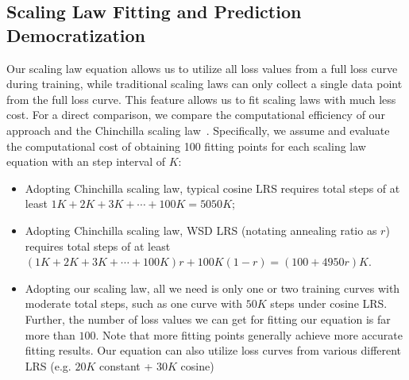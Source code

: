 \subsection{Scaling Law Fitting and Prediction Democratization}

Our scaling law equation allows us to utilize all loss values from a full loss curve during training, while traditional scaling laws can only collect a single data point from the full loss curve. This feature allows us to fit scaling laws with much less cost.
For a direct comparison, we compare the computational efficiency of our approach and the Chinchilla scaling law~\citep{hoffmann2022training}.
Specifically, we assume and evaluate the computational cost of obtaining 100 fitting points for each scaling law equation with an step interval of $K$: 

\begin{itemize}
    \item Adopting Chinchilla scaling law, typical cosine LRS requires total steps of at least $1K + 2K + 3K + \cdots + 100K = 5050K$;
    \item Adopting Chinchilla scaling law, WSD LRS (notating annealing ratio as $r$) requires total steps of at least $(1K + 2K + 3K + \cdots + 100K)r + 100K(1-r) = (100 + 4950r)K$.
    \item Adopting our scaling law, all we need is only one or two training curves with moderate total steps, such as one curve with $50K$ steps under cosine LRS. Further, the number of loss values we can get for fitting our equation is far more than $100$. Note that more fitting points generally achieve more accurate fitting results. Our equation can also utilize loss curves from various different LRS (e.g. $20K$ constant + $30K$ cosine)
\end{itemize}


